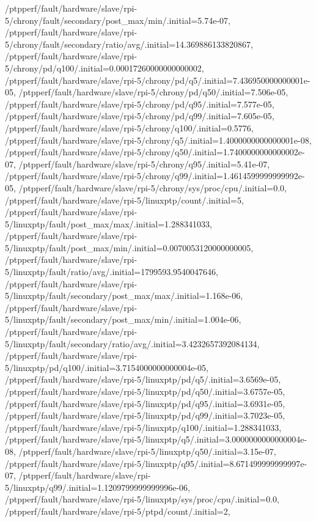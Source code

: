 {    /ptpperf/fault/hardware/slave/rpi-5/chrony/fault/secondary/post_max/min/.initial=5.74e-07,
    /ptpperf/fault/hardware/slave/rpi-5/chrony/fault/secondary/ratio/avg/.initial=14.369886133820867,
    /ptpperf/fault/hardware/slave/rpi-5/chrony/pd/q100/.initial=0.00017260000000000002,
    /ptpperf/fault/hardware/slave/rpi-5/chrony/pd/q5/.initial=7.436950000000001e-05,
    /ptpperf/fault/hardware/slave/rpi-5/chrony/pd/q50/.initial=7.506e-05,
    /ptpperf/fault/hardware/slave/rpi-5/chrony/pd/q95/.initial=7.577e-05,
    /ptpperf/fault/hardware/slave/rpi-5/chrony/pd/q99/.initial=7.605e-05,
    /ptpperf/fault/hardware/slave/rpi-5/chrony/q100/.initial=0.5776,
    /ptpperf/fault/hardware/slave/rpi-5/chrony/q5/.initial=1.4000000000000001e-08,
    /ptpperf/fault/hardware/slave/rpi-5/chrony/q50/.initial=1.7400000000000002e-07,
    /ptpperf/fault/hardware/slave/rpi-5/chrony/q95/.initial=5.41e-07,
    /ptpperf/fault/hardware/slave/rpi-5/chrony/q99/.initial=1.4614599999999992e-05,
    /ptpperf/fault/hardware/slave/rpi-5/chrony/sys/proc/cpu/.initial=0.0,
    /ptpperf/fault/hardware/slave/rpi-5/linuxptp/count/.initial=5,
    /ptpperf/fault/hardware/slave/rpi-5/linuxptp/fault/post_max/max/.initial=1.288341033,
    /ptpperf/fault/hardware/slave/rpi-5/linuxptp/fault/post_max/min/.initial=0.0070053120000000005,
    /ptpperf/fault/hardware/slave/rpi-5/linuxptp/fault/ratio/avg/.initial=1799593.9540047646,
    /ptpperf/fault/hardware/slave/rpi-5/linuxptp/fault/secondary/post_max/max/.initial=1.168e-06,
    /ptpperf/fault/hardware/slave/rpi-5/linuxptp/fault/secondary/post_max/min/.initial=1.004e-06,
    /ptpperf/fault/hardware/slave/rpi-5/linuxptp/fault/secondary/ratio/avg/.initial=3.4232657392084134,
    /ptpperf/fault/hardware/slave/rpi-5/linuxptp/pd/q100/.initial=3.7154000000000004e-05,
    /ptpperf/fault/hardware/slave/rpi-5/linuxptp/pd/q5/.initial=3.6569e-05,
    /ptpperf/fault/hardware/slave/rpi-5/linuxptp/pd/q50/.initial=3.6757e-05,
    /ptpperf/fault/hardware/slave/rpi-5/linuxptp/pd/q95/.initial=3.6931e-05,
    /ptpperf/fault/hardware/slave/rpi-5/linuxptp/pd/q99/.initial=3.7023e-05,
    /ptpperf/fault/hardware/slave/rpi-5/linuxptp/q100/.initial=1.288341033,
    /ptpperf/fault/hardware/slave/rpi-5/linuxptp/q5/.initial=3.0000000000000004e-08,
    /ptpperf/fault/hardware/slave/rpi-5/linuxptp/q50/.initial=3.15e-07,
    /ptpperf/fault/hardware/slave/rpi-5/linuxptp/q95/.initial=8.671499999999997e-07,
    /ptpperf/fault/hardware/slave/rpi-5/linuxptp/q99/.initial=1.1209799999999996e-06,
    /ptpperf/fault/hardware/slave/rpi-5/linuxptp/sys/proc/cpu/.initial=0.0,
    /ptpperf/fault/hardware/slave/rpi-5/ptpd/count/.initial=2,
}
